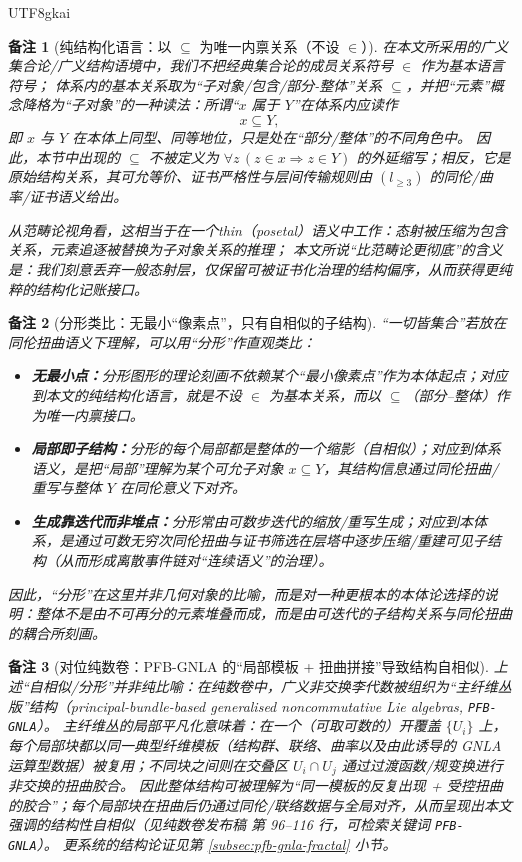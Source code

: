 \documentclass[12pt]{article}
\newtheorem{remark}{备注}[section]
\begin{document}
\begin{CJK*}{UTF8}{gkai}
\begin{remark}[纯结构化语言：以 $\subseteq$ 为唯一内禀关系（不设 $\in$）]\label{rem:subset-only-language}
在本文所采用的广义集合论/广义结构语境中，我们不把经典集合论的成员关系符号 $\in$ 作为\emph{基本}语言符号；
体系内的基本关系取为“子对象/包含/部分-整体”关系 $\subseteq$，并把“元素”概念降格为“子对象”的一种读法：所谓“$x$ 属于 $Y$”在体系内应读作
\[
  x\subseteq Y,
\]
即 $x$ 与 $Y$ 在本体上同型、同等地位，只是处在“部分/整体”的不同角色中。
因此，本节中出现的 $\subseteq$ 不被定义为 $\forall z\,(z\in x\Rightarrow z\in Y)$ 的外延缩写；相反，它是\emph{原始}结构关系，其可允等价、证书严格性与层间传输规则由
  $(l_{\ge3})$ 的同伦/曲率/证书语义给出。

从范畴论视角看，这相当于在一个\emph{thin}（posetal）语义中工作：态射被压缩为包含关系，元素追逐被替换为子对象关系的推理；
本文所说“比范畴论更彻底”的含义是：我们刻意丢弃一般态射层，仅保留可被证书化治理的结构偏序，从而获得更纯粹的结构化记账接口。
\end{remark}

\begin{remark}[分形类比：无最小“像素点”，只有自相似的子结构]\label{rem:fractal-substructure}
“一切皆集合”若放在同伦扭曲语义下理解，可以用“分形”作直观类比：
\begin{itemize}
  \item \textbf{无最小点：}分形图形的理论刻画不依赖某个“最小像素点”作为本体起点；对应到本文的纯结构化语言，就是不设 $\in$ 为基本关系，而以 $\subseteq$（部分--整体）作为唯一内禀接口。
  \item \textbf{局部即子结构：}分形的每个局部都是整体的一个缩影（自相似）；对应到体系语义，是把“局部”理解为某个可允子对象 $x\subseteq Y$，其结构信息通过同伦扭曲/重写与整体 $Y$ 在同伦意义下对齐。
  \item \textbf{生成靠迭代而非堆点：}分形常由可数步迭代的缩放/重写生成；对应到本体系，是通过可数无穷次同伦扭曲与证书筛选在层塔中逐步压缩/重建可见子结构（从而形成离散事件链对“连续语义”的治理）。
\end{itemize}
因此，“分形”在这里并非几何对象的比喻，而是对一种更根本的本体论选择的说明：整体不是由不可再分的元素堆叠而成，而是由可迭代的子结构关系与同伦扭曲的耦合所刻画。
\end{remark}

\begin{remark}[对位纯数卷：PFB-GNLA 的“局部模板 + 扭曲拼接”导致结构自相似]\label{rem:pfb-gnla-self-similarity}
上述“自相似/分形”并非纯比喻：在纯数卷中，广义非交换李代数被组织为“主纤维丛版”结构（principal-bundle-based generalised noncommutative Lie algebras,
  \texttt{PFB-GNLA}）。
主纤维丛的局部平凡化意味着：在一个（可取可数的）开覆盖 $\{U_i\}$ 上，每个局部块都以同一典型纤维模板（结构群、联络、曲率以及由此诱导的 GNLA 运算型数据）被复用；不同块之间则在交叠区 $U_i\cap U_j$
  通过过渡函数/规变换进行\emph{非交换}的扭曲胶合。
因此整体结构可被理解为“同一模板的反复出现 + 受控扭曲的胶合”；每个局部块在扭曲后仍通过同伦/联络数据与全局对齐，从而呈现出本文强调的结构性自相似（见纯数卷发布稿\cite{GaoZheng2025GFramework} 第
  96--116 行，可检索关键词 \texttt{PFB-GNLA}）。
更系统的结构论证见第 \ref{subsec:pfb-gnla-fractal} 小节。
\end{remark}


\end{CJK*}
\end{document}
